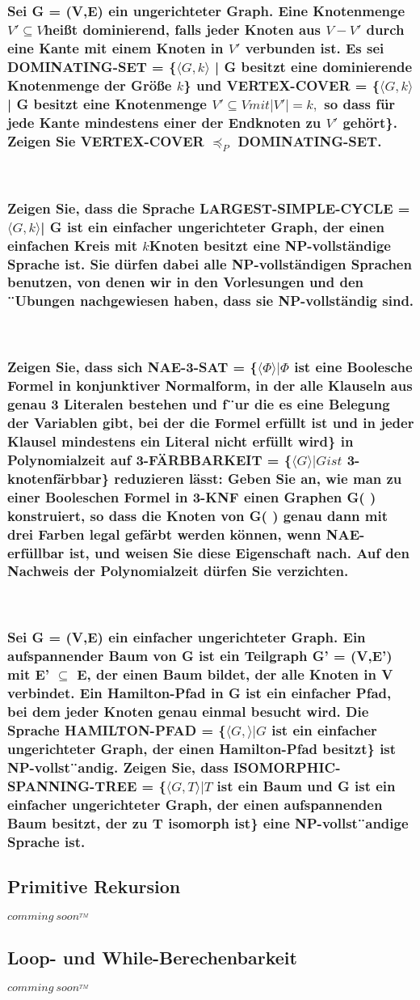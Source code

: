 \documentclass[a4paper,12pt]{article}
\newcommand{\soon}{\large{$comming~ soon^{_{TM}}$\\}}
\begin{document}
	\subsubsection{Sei G = (V,E) ein ungerichteter Graph. Eine Knotenmenge $V' \subseteq V $heißt dominierend, falls jeder Knoten aus $V−V'$ durch eine Kante mit einem Knoten in $V'$ verbunden ist. Es sei DOMINATING-SET = \{$\langle G,k\rangle$ | G besitzt eine dominierende Knotenmenge der Gr\"oße $k$\} und VERTEX-COVER = \{$\langle G,k\rangle$ | G besitzt eine Knotenmenge $V' \subseteq V mit |V'| = k,$ so dass f\"ur jede Kante mindestens einer der Endknoten zu $V'$ geh\"ort\}. Zeigen Sie	VERTEX-COVER $\preceq_P$ DOMINATING-SET.}
	~
	\subsubsection{Zeigen Sie, dass die Sprache LARGEST-SIMPLE-CYCLE = {$\langle G,k\rangle$| G ist ein einfacher ungerichteter Graph, der einen einfachen Kreis mit $k $Knoten besitzt} eine NP-vollst\"andige Sprache ist. Sie d\"urfen dabei alle NP-vollst\"andigen Sprachen benutzen, von denen wir in den Vorlesungen und den ¨Ubungen nachgewiesen haben, dass sie NP-vollst\"andig sind.}
	~
	\subsubsection{Zeigen Sie, dass sich NAE-3-SAT = \{$\langle \Phi\rangle| \Phi$ ist eine Boolesche Formel in konjunktiver Normalform, in der alle Klauseln aus genau 3 Literalen bestehen und f¨ur die es eine Belegung der Variablen gibt, bei der die Formel erf\"ullt ist und in jeder Klausel mindestens ein Literal nicht erf\"ullt wird\} in Polynomialzeit auf 3-F\"ARBBARKEIT = \{$\langle G\rangle | G ist$ 3-knotenf\"arbbar\} reduzieren l\"asst: Geben Sie an, wie man zu einer Booleschen Formel in 3-KNF einen Graphen G( ) konstruiert, so dass die Knoten von G( ) genau dann mit drei Farben legal gef\"arbt werden k\"onnen, wenn NAE-erf\"ullbar ist, und weisen Sie diese Eigenschaft nach. Auf den Nachweis der Polynomialzeit d\"urfen Sie verzichten.}
	~
	\subsubsection{Sei G = (V,E) ein einfacher ungerichteter Graph. Ein aufspannender Baum von G ist ein Teilgraph G' = (V,E') mit E' $\subseteq$ E, der einen Baum bildet, der alle Knoten in V verbindet. Ein Hamilton-Pfad in G ist ein einfacher Pfad, bei dem jeder Knoten genau einmal besucht wird. Die Sprache HAMILTON-PFAD = \{$\langle G,\rangle| G$ ist ein einfacher ungerichteter Graph, der einen Hamilton-Pfad besitzt\} ist NP-vollst¨andig. Zeigen Sie, dass ISOMORPHIC-SPANNING-TREE = \{$\langle G,T\rangle| T$ ist ein Baum und G ist ein einfacher ungerichteter Graph, der einen aufspannenden Baum besitzt, der zu T isomorph ist\} eine NP-vollst¨andige Sprache ist.}
	
	\subsection{Primitive Rekursion}
	
	\soon
	
	\subsection{Loop- und While-Berechenbarkeit}
	\soon
	
	
\end{document}

